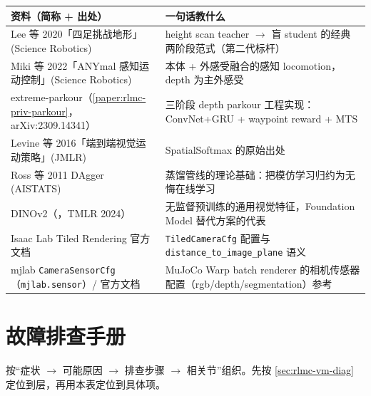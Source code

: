 \begin{center}
\small
\begin{tabular}{@{}p{5.6cm}p{5.8cm}@{}}
\toprule
资料（简称 + 出处） & 一句话教什么 \\
\midrule
Lee 等 2020「四足挑战地形」(Science Robotics)\,\cite{lee2020quadruped} & height scan teacher $\to$ 盲 student 的经典两阶段范式（第二代标杆） \\
Miki 等 2022「ANYmal 感知运动控制」(Science Robotics)\,\cite{miki2022perceptive} & 本体 + 外感受融合的感知 locomotion，depth 为主外感受 \\
extreme-parkour（\cref{paper:rlmc-priv-parkour}，arXiv:2309.14341） & 三阶段 depth parkour 工程实现：ConvNet+GRU + waypoint reward + MTS \\
Levine 等 2016「端到端视觉运动策略」(JMLR)\,\cite{levine2016visuomotor} & SpatialSoftmax 的原始出处 \\
Ross 等 2011 DAgger (AISTATS)\,\cite{ross2011dagger} & 蒸馏管线的理论基础：把模仿学习归约为无悔在线学习 \\
DINOv2（\cite{oquab2024dinov2}，TMLR 2024） & 无监督预训练的通用视觉特征，Foundation Model 替代方案的代表 \\
Isaac Lab Tiled Rendering 官方文档 & \texttt{TiledCameraCfg} 配置与 \texttt{distance\_to\_image\_plane} 语义 \\
mjlab \texttt{CameraSensorCfg}（\texttt{mjlab.\allowbreak sensor}）/ 官方文档 & MuJoCo Warp batch renderer 的相机传感器配置（rgb/depth/segmentation）参考 \\
\bottomrule
\end{tabular}
\end{center}

\section{故障排查手册}
\label{sec:rlmc-vm-trouble}

按“症状 $\to$ 可能原因 $\to$ 排查步骤 $\to$ 相关节”组织。先按 \cref{sec:rlmc-vm-diag} 定位到层，再用本表定位到具体项。

